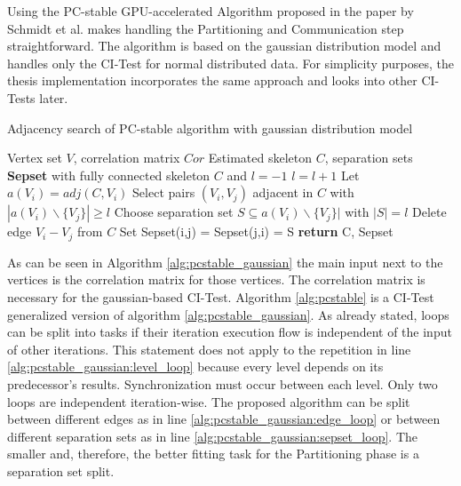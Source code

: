 Using the PC-stable GPU-accelerated Algorithm proposed in the paper by Schmidt et al. \cite{schmidtOrderIndependentConstraintBasedCausal2018} makes handling the Partitioning and Communication step straightforward. The algorithm is based on the gaussian distribution model and handles only the CI-Test for normal distributed data. For simplicity purposes, the thesis implementation incorporates the same approach and looks into other CI-Tests later.

\begin{algorithm}
    \caption{Adjacency search of PC-stable algorithm with gaussian distribution model \cite{schmidtOrderIndependentConstraintBasedCausal2018, colomboOrderIndependentConstraintBasedCausal}}
    \label{alg:pcstable_gaussian}
    \begin{algorithmic}[1]
    \Require Vertex set $V$, correlation matrix $Cor$
    \Ensure Estimated skeleton $C$, separation sets \textbf{Sepset}
    \State with fully connected skeleton $C$ and $l = -1$
    \Repeat \label{alg:pcstable_gaussian:level_loop}
        \State $l=l+1$
            \State Let $a(V_i) = adj(C,V_i)$
        \EndFor
        \Repeat \label{alg:pcstable_gaussian:edge_loop}
            \State Select pairs $(V_i,V_j)$ adjacent in $C$ with $|a(V_i)\backslash\{V_j\}| \geq l$
            \Repeat \label{alg:pcstable_gaussian:sepset_loop}
                \State Choose separation set $S \subseteq a(V_i ) \backslash \{V_j\}|$ with $| S | = l$
                    \State Delete edge $V_i - V_j$ from $C$
                    \State Set Sepset(i,j) = Sepset(j,i) = S
                \EndIf
    \State \textbf{return} C, Sepset
    \end{algorithmic}
\end{algorithm}

As can be seen in Algorithm \ref{alg:pcstable_gaussian} the main input next to the vertices is the correlation matrix for those vertices. The correlation matrix is necessary for the gaussian-based CI-Test. Algorithm \ref{alg:pcstable} is a CI-Test generalized version of algorithm \ref{alg:pcstable_gaussian}.
As already stated, loops can be split into tasks if their iteration execution flow is independent of the input of other iterations. This statement does not apply to the repetition in line \ref{alg:pcstable_gaussian:level_loop} because every level depends on its predecessor's results. Synchronization must occur between each level.
Only two loops are independent iteration-wise. The proposed algorithm can be split between different edges as in line \ref{alg:pcstable_gaussian:edge_loop} or between different separation sets as in line \ref{alg:pcstable_gaussian:sepset_loop}. The smaller and, therefore, the better fitting task for the Partitioning phase is a separation set split.

